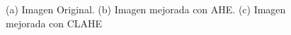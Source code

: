 \begin{figure}[H]
    \captionsetup[figure]{labelformat=empty}
    \centering
    \caption{(a) Imagen Original. (b) Imagen mejorada con AHE. (c) Imagen mejorada con CLAHE}
    \label{clahe_ahe}
\end{figure}